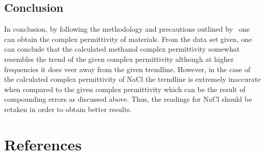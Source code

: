 \documentclass[12pt, a4paper]{article}
\begin{document}
\begin{multicols*}{2}
\section{Conclusion}
In conclusion, by following the methodology and precautions outlined by~\cite{marsland1987dielectric} one can obtain the complex permittivity of materials. From the data set given, one can conclude that the calculated methanol complex permittivity somewhat resembles the trend of the given complex permittivity although at higher frequencies it does veer away from the given trendline. However, in the case of the calculated complex permittivity of NaCl the trendline is extremely inaccurate when compared to the given complex permittivity which can be the result of compounding errors as discussed above. Thus, the readings for NaCl should be retaken in order to obtain better results.

\end{multicols*}

\section{References}
\printbibliography[heading = none]
\end{document}
